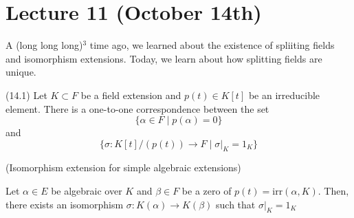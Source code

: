 \section{Lecture 11 (October 14th)}
\begin{rmk}
A (long long long)$^3$ time ago, we learned about the existence of spliiting fields and isomorphism extensions. Today, we learn about how splitting fields are unique.
\end{rmk}
\vspace{2ex}
\begin{prop}
(14.1) Let $K\subset F$ be a field extension and $p(t)\in K[t]$ be an irreducible element. There is a one-to-one correspondence between the set 
\[\{\alpha \in F \;|\; p(\alpha )=0\}\]
and
\[\{\sigma :K[t]/(p(t))\rightarrow F\;|\;\sigma |_{K}=\mathrm{1}_{K}\}\]
\end{prop}
\vspace{2ex}
\begin{thm}
(Isomorphism extension for simple algebraic extensions)
\begin{center}
\end{center}
Let $\alpha \in E$ be algebraic over $K$ and $\beta \in F$ be a zero of $p(t)=\mathrm{irr}(\alpha ,K)$. Then, there exists an isomorphism $\sigma :K(\alpha )\rightarrow K(\beta )$ such that $\sigma |_{K}=\mathrm{1}_{K}$
\end{thm}
